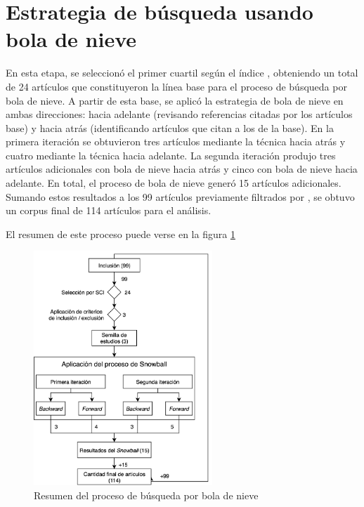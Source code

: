 \section{Estrategia de búsqueda usando bola de nieve}\label{sec:bolaDeNieve}
\noindent

En esta etapa, se seleccionó el primer cuartil según el índice \SCI, obteniendo un total de 24 artículos que constituyeron la línea base para el proceso de búsqueda por bola de nieve. A partir de esta base, se aplicó la estrategia de bola de nieve en ambas direcciones: hacia adelante (revisando referencias citadas por los artículos base) y hacia atrás (identificando artículos que citan a los de la base). En la primera iteración se obtuvieron tres artículos mediante la técnica hacia atrás y cuatro mediante la técnica hacia adelante. La segunda iteración produjo tres artículos adicionales con bola de nieve hacia atrás y cinco con bola de nieve hacia adelante. En total, el proceso de bola de nieve generó 15 artículos adicionales. Sumando estos resultados a los 99 artículos previamente filtrados por \SCI, se obtuvo un corpus final de 114 artículos para el análisis.

El resumen de este proceso puede verse en la figura \ref{fig:resumen-snowball}

\begin{figure}[H]
	\begin{center}
		\includegraphics[width=0.6\textwidth]{tablas-images/sms/resumen-snowball.png}
	\end{center}
	\caption{Resumen del proceso de búsqueda por bola de nieve}\label{fig:resumen-snowball}
\end{figure}



